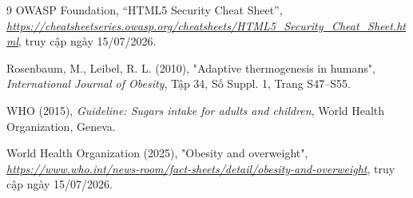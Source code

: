 \documentclass[12pt, a4paper]{report}
\begin{document}
\begin{thebibliography}{9}
OWASP Foundation,
``HTML5 Security Cheat Sheet'',
\textit{\url{https://cheatsheetseries.owasp.org/cheatsheets/HTML5_Security_Cheat_Sheet.html}},
truy cập ngày 15/07/2026.

Rosenbaum, M., Leibel, R. L. (2010),
"Adaptive thermogenesis in humans",
\textit{International Journal of Obesity}, Tập 34, Số Suppl. 1, Trang S47--S55.

WHO (2015),
\textit{Guideline: Sugars intake for adults and children},
World Health Organization, Geneva.

World Health Organization (2025),
"Obesity and overweight",
\textit{\url{https://www.who.int/news-room/fact-sheets/detail/obesity-and-overweight}}, truy cập ngày 15/07/2026.

\end{thebibliography}
\end{document}
